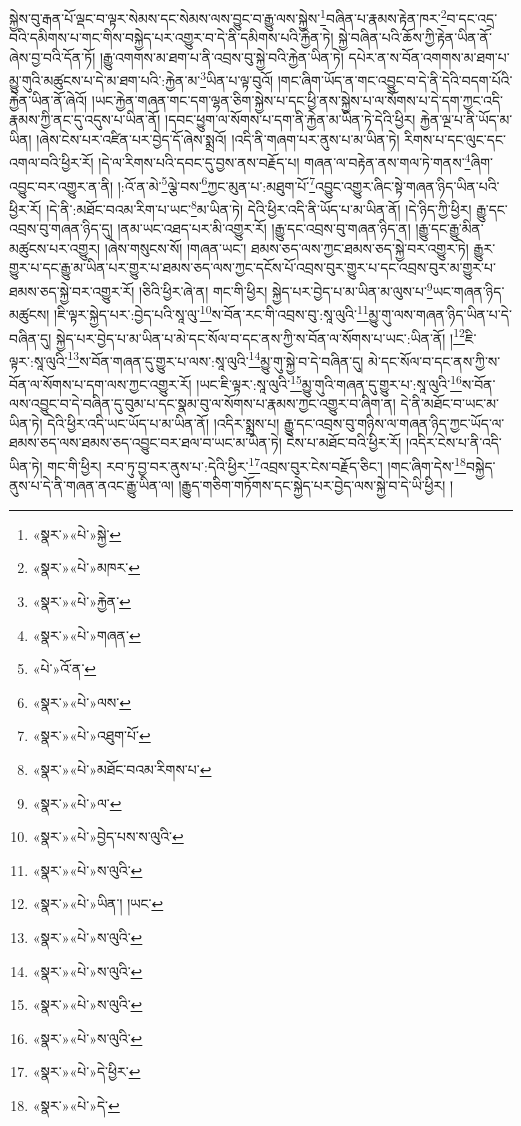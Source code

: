 སྐྱེས་བུ་རྒན་པོ་ལྡང་བ་ལྟར་སེམས་དང་སེམས་ལས་བྱུང་བ་རྒྱུ་ལས་སྐྱེས་\footnote{«སྣར་»«པེ་»སྐྱེ་}བཞིན་པ་རྣམས་རྟེན་ཁར་\footnote{«སྣར་»«པེ་»མཁར་}བ་དང་འདྲ་བའི་དམིགས་པ་གང་གིས་བསྐྱེད་པར་འགྱུར་བ་དེ་ནི་དམིགས་པའི་རྐྱེན་ཏེ། སྐྱེ་བཞིན་པའི་ཆོས་ཀྱི་རྟེན་ཡིན་ནོ་ཞེས་བྱ་བའི་དོན་ཏོ། །རྒྱུ་འགགས་མ་ཐག་པ་ནི་འབྲས་བུ་སྐྱེ་བའི་རྐྱེན་ཡིན་ཏེ། དཔེར་ན་ས་བོན་འགགས་མ་ཐག་པ་མྱུ་གུའི་མཚུངས་པ་དེ་མ་ཐག་པའི་:རྐྱེན་མ་\footnote{«སྣར་»«པེ་»རྐྱེན་}ཡིན་པ་ལྟ་བུའོ། །གང་ཞིག་ཡོད་ན་གང་འབྱུང་བ་དེ་ནི་དེའི་བདག་པོའི་རྐྱེན་ཡིན་ནོ་ཞེའོ། །ཡང་རྐྱེན་གཞན་གང་དག་ལྷན་ཅིག་སྐྱེས་པ་དང་ཕྱི་ནས་སྐྱེས་པ་ལ་སོགས་པ་དེ་དག་ཀྱང་འདི་རྣམས་ཀྱི་ནང་དུ་འདུས་པ་ཡིན་ནོ། །དབང་ཕྱུག་ལ་སོགས་པ་དག་ནི་རྐྱེན་མ་ཡིན་ཏེ་དེའི་ཕྱིར། རྐྱེན་ལྔ་པ་ནི་ཡོད་མ་ཡིན། །ཞེས་ངེས་པར་འཛིན་པར་བྱེད་དོ་ཞེས་སྨྲའོ། །འདི་ནི་གཞག་པར་ནུས་པ་མ་ཡིན་ཏེ། རིགས་པ་དང་ལུང་དང་འགལ་བའི་ཕྱིར་རོ། །དེ་ལ་རིགས་པའི་དབང་དུ་བྱས་ནས་བརྗོད་པ། གཞན་ལ་བརྟེན་ནས་གལ་ཏེ་གནས་\footnote{«སྣར་»«པེ་»གཞན་}ཞིག་འབྱུང་བར་འགྱུར་ན་ནི། །:འོ་ན་མེ་\footnote{«པེ་»འོ་ན་}ལྕེ་བས་\footnote{«སྣར་»«པེ་»ལས་}ཀྱང་མུན་པ་:མཐུག་པོ་\footnote{«སྣར་»«པེ་»འཐུག་པོ་}འབྱུང་འགྱུར་ཞིང་སྟེ་གཞན་ཉིད་ཡིན་པའི་ཕྱིར་རོ། །དེ་ནི་:མཐོང་བའམ་རིག་པ་ཡང་\footnote{«སྣར་»«པེ་»མཐོང་བའམ་རིགས་པ་}མ་ཡིན་ཏེ། དེའི་ཕྱིར་འདི་ནི་ཡོད་པ་མ་ཡིན་ནོ། །དེ་ཉིད་ཀྱི་ཕྱིར། རྒྱུ་དང་འབྲས་བུ་གཞན་ཉིད་དུ། །ནམ་ཡང་འཐད་པར་མི་འགྱུར་རོ། །རྒྱུ་དང་འབྲས་བུ་གཞན་ཉིད་ན། །རྒྱུ་དང་རྒྱུ་མིན་མཚུངས་པར་འགྱུར། །ཞེས་གསུངས་སོ། །གཞན་ཡང་། ཐམས་ཅད་ལས་ཀྱང་ཐམས་ཅད་སྐྱེ་བར་འགྱུར་ཏེ། རྒྱུར་གྱུར་པ་དང་རྒྱུ་མ་ཡིན་པར་གྱུར་པ་ཐམས་ཅད་ལས་ཀྱང་དངོས་པོ་འབྲས་བུར་གྱུར་པ་དང་འབྲས་བུར་མ་གྱུར་པ་ཐམས་ཅད་སྐྱེ་བར་འགྱུར་རོ། །ཅིའི་ཕྱིར་ཞེ་ན། གང་གི་ཕྱིར། སྐྱེད་པར་བྱེད་པ་མ་ཡིན་མ་ལུས་པ་\footnote{«སྣར་»«པེ་»ལ་}ཡང་གཞན་ཉིད་མཚུངས། །ཇི་ལྟར་སྐྱེད་པར་:བྱེད་པའི་སཱ་ལུ་\footnote{«སྣར་»«པེ་»བྱེད་པས་ས་ལུའི་}ས་བོན་རང་གི་འབྲས་བུ་:སཱ་ལུའི་\footnote{«སྣར་»«པེ་»ས་ལུའི་}མྱུ་གུ་ལས་གཞན་ཉིད་ཡིན་པ་དེ་བཞིན་དུ། སྐྱེད་པར་བྱེད་པ་མ་ཡིན་པ་མེ་དང་སོལ་བ་དང་ནས་ཀྱི་ས་བོན་ལ་སོགས་པ་ཡང་:ཡིན་ནོ། །\footnote{«སྣར་»«པེ་»ཡིན་། །ཡང་}ཇི་ལྟར་:སཱ་ལུའི་\footnote{«སྣར་»«པེ་»ས་ལུའི་}ས་བོན་གཞན་དུ་གྱུར་པ་ལས་:སཱ་ལུའི་\footnote{«སྣར་»«པེ་»ས་ལུའི་}མྱུ་གུ་སྐྱེ་བ་དེ་བཞིན་དུ། མེ་དང་སོལ་བ་དང་ནས་ཀྱི་ས་བོན་ལ་སོགས་པ་དག་ལས་ཀྱང་འགྱུར་རོ། །ཡང་ཇི་ལྟར་:སཱ་ལུའི་\footnote{«སྣར་»«པེ་»ས་ལུའི་}མྱུ་གུའི་གཞན་དུ་གྱུར་པ་:སཱ་ལུའི་\footnote{«སྣར་»«པེ་»ས་ལུའི་}ས་བོན་ལས་འབྱུང་བ་དེ་བཞིན་དུ་བུམ་པ་དང་སྣམ་བུ་ལ་སོགས་པ་རྣམས་ཀྱང་འགྱུར་བ་ཞིག་ན། དེ་ནི་མཐོང་བ་ཡང་མ་ཡིན་ཏེ། དེའི་ཕྱིར་འདི་ཡང་ཡོད་པ་མ་ཡིན་ནོ། །འདིར་སྨྲས་པ། རྒྱུ་དང་འབྲས་བུ་གཉིས་ལ་གཞན་ཉིད་ཀྱང་ཡོད་ལ་ཐམས་ཅད་ལས་ཐམས་ཅད་འབྱུང་བར་ཐལ་བ་ཡང་མ་ཡིན་ཏེ། ངེས་པ་མཐོང་བའི་ཕྱིར་རོ། །འདིར་ངེས་པ་ནི་འདི་ཡིན་ཏེ། གང་གི་ཕྱིར། རབ་ཏུ་བྱ་བར་ནུས་པ་:དེའི་ཕྱིར་\footnote{«སྣར་»«པེ་»དེ་ཕྱིར་}འབྲས་བུར་ངེས་བརྗོད་ཅིང་། །གང་ཞིག་དེས་\footnote{«སྣར་»«པེ་»དེ་}བསྐྱེད་ནུས་པ་དེ་ནི་གཞན་ནའང་རྒྱུ་ཡིན་ལ། །རྒྱུད་གཅིག་གཏོགས་དང་སྐྱེད་པར་བྱེད་ལས་སྐྱེ་བ་དེ་ཡི་ཕྱིར། །
